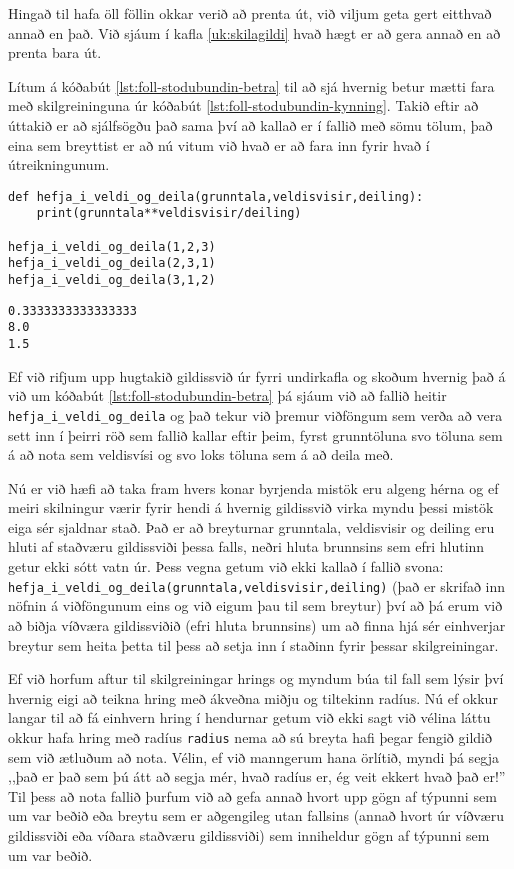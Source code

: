 Hingað til hafa öll föllin okkar verið að prenta út, við viljum geta gert eitthvað annað en það.
Við sjáum í kafla \ref{uk:skilagildi} hvað hægt er að gera annað en að prenta bara út.

Lítum á kóðabút \ref{lst:foll-stodubundin-betra} til að sjá hvernig betur mætti fara með skilgreininguna úr kóðabút \ref{lst:foll-stodubundin-kynning}.
Takið eftir að úttakið er að sjálfsögðu það sama því að kallað er í fallið með sömu tölum, það eina sem breyttist er að nú vitum við hvað er að fara inn fyrir hvað í útreikningunum.

\begin{lstlisting}[caption=Stöðubundin viðföng með skýrari breytuheitum, label=lst:foll-stodubundin-betra]
def hefja_i_veldi_og_deila(grunntala,veldisvisir,deiling):	
	print(grunntala**veldisvisir/deiling)

hefja_i_veldi_og_deila(1,2,3)
hefja_i_veldi_og_deila(2,3,1)
hefja_i_veldi_og_deila(3,1,2)
\end{lstlisting}
\lstset{style=uttak}
\begin{lstlisting}
0.3333333333333333
8.0
1.5
\end{lstlisting}
\lstset{style=venjulegt}

Ef við rifjum upp hugtakið gildissvið úr fyrri undirkafla og skoðum hvernig það á við um kóðabút \ref{lst:foll-stodubundin-betra} þá sjáum við að fallið heitir \texttt{hefja\_i\_veldi\_og\_deila} og það tekur við þremur viðföngum sem verða að vera sett inn í þeirri röð sem fallið kallar eftir þeim, fyrst grunntöluna svo töluna sem á að nota sem veldisvísi og svo loks töluna sem á að deila með.

Nú er við hæfi að taka fram hvers konar byrjenda mistök eru algeng hérna og ef meiri skilningur værir fyrir hendi á hvernig gildissvið virka myndu þessi mistök eiga sér sjaldnar stað.
Það er að breyturnar grunntala, veldisvisir og deiling eru hluti af staðværu gildissviði þessa falls, neðri hluta brunnsins sem efri hlutinn getur ekki sótt vatn úr.
Þess vegna getum við ekki kallað í fallið svona: \texttt{hefja\_i\_veldi\_og\_deila(grunntala,veldisvisir,deiling)} (það er skrifað inn nöfnin á viðföngunum eins og við eigum þau til sem breytur) því að þá erum við að biðja víðværa gildissviðið (efri hluta brunnsins) um að finna hjá sér einhverjar breytur sem heita þetta til þess að setja inn í staðinn fyrir þessar skilgreiningar.

Ef við horfum aftur til skilgreiningar hrings og myndum búa til fall sem lýsir því hvernig eigi að teikna hring með ákveðna miðju og tiltekinn radíus.
Nú ef okkur langar til að fá einhvern hring í hendurnar getum við ekki sagt við vélina láttu okkur hafa hring með radíus \texttt{radius} nema að sú breyta hafi þegar fengið gildið sem við ætluðum að nota.
Vélin, ef við manngerum hana örlítið, myndi þá segja ,,það er það sem þú átt að segja mér, hvað radíus er, ég veit ekkert hvað það er!''
Til þess að nota fallið þurfum við að gefa annað hvort upp gögn af týpunni sem um var beðið eða breytu sem er aðgengileg utan fallsins (annað hvort úr víðværu gildissviði eða víðara staðværu gildissviði) sem inniheldur gögn af týpunni sem um var beðið.

